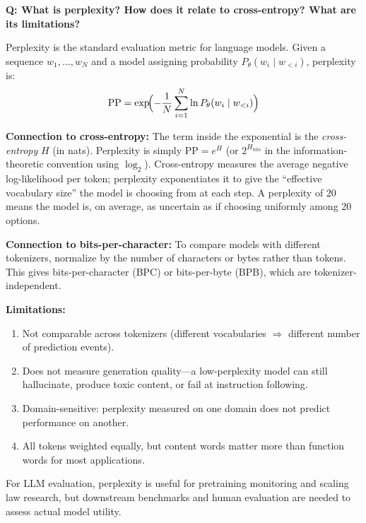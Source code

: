\begin{interviewq}
\textbf{Q: What is perplexity? How does it relate to cross-entropy? What are its
limitations?}

 \quad {} \quad \badgefreq{\freqhigh}

\stronganswer
Perplexity is the standard evaluation metric for language models.  Given a
sequence $w_1, \ldots, w_N$ and a model assigning probability
$P_\theta(w_i \mid w_{<i})$, perplexity is:
\[
    \text{PP} = \exp\!\Bigl(-\frac{1}{N}\sum_{i=1}^{N}\ln P_\theta(w_i \mid w_{<i})\Bigr)
\]

\textbf{Connection to cross-entropy:}  The term inside the exponential is the
\emph{cross-entropy} $H$ (in nats).  Perplexity is simply $\text{PP} = e^H$
(or $2^{H_{\text{bits}}}$ in the information-theoretic convention using
$\log_2$).  Cross-entropy measures the average negative log-likelihood per
token; perplexity exponentiates it to give the ``effective vocabulary size'' the
model is choosing from at each step.  A perplexity of 20 means the model is, on
average, as uncertain as if choosing uniformly among 20 options.

\textbf{Connection to bits-per-character:}  To compare models with different
tokenizers, normalize by the number of characters or bytes rather than tokens.
This gives bits-per-character (BPC) or bits-per-byte (BPB), which are
tokenizer-independent.

\textbf{Limitations:}
\begin{enumerate}
    \item Not comparable across tokenizers (different vocabularies $\Rightarrow$
          different number of prediction events).
    \item Does not measure generation quality---a low-perplexity model can still
          hallucinate, produce toxic content, or fail at instruction following.
    \item Domain-sensitive: perplexity measured on one domain does not predict
          performance on another.
    \item All tokens weighted equally, but content words matter more than
          function words for most applications.
\end{enumerate}

For LLM evaluation, perplexity is useful for pretraining monitoring and scaling
law research, but downstream benchmarks and human evaluation are needed to assess
actual model utility.


\end{interviewq}
